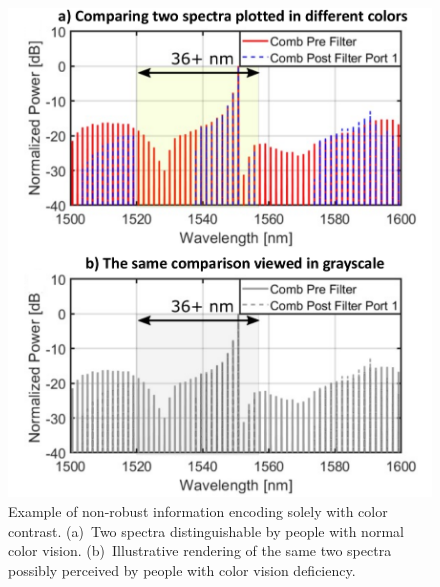 \begin{figure}
    \vspace{-1em}
    \begin{center}
        \includegraphics[width=\linewidth]{../../6_figures/ts_fig_color.pdf}
    \end{center}
    \caption{Example of non-robust information encoding solely with color contrast. (a)~Two spectra distinguishable by people with normal color vision. (b)~Illustrative rendering of the same two spectra possibly perceived by people with color vision deficiency.}
    \label{fig:color}
    \vspace{-0.5em}
\end{figure}

